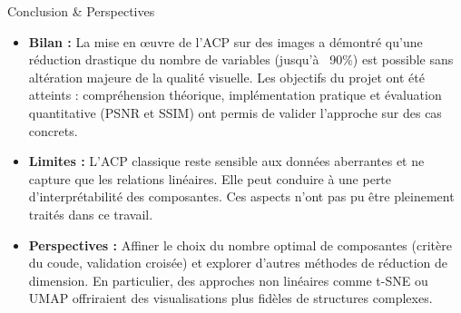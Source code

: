 \documentclass{beamer}
\begin{document}
\begin{frame}{Conclusion \& Perspectives}
\begin{itemize}
  \item \textbf{Bilan :} La mise en œuvre de l’ACP sur des images a démontré qu’une réduction drastique du nombre de variables (jusqu’à ~90\%) est possible sans altération majeure de la qualité visuelle. Les objectifs du projet ont été atteints : compréhension théorique, implémentation pratique et évaluation quantitative (PSNR et SSIM) ont permis de valider l’approche sur des cas concrets.
  \item \textbf{Limites :} L’ACP classique reste sensible aux données aberrantes et ne capture que les relations linéaires. Elle peut conduire à une perte d’interprétabilité des composantes. Ces aspects n’ont pas pu être pleinement traités dans ce travail.
  \item \textbf{Perspectives :} Affiner le choix du nombre optimal de composantes (critère du coude, validation croisée) et explorer d’autres méthodes de réduction de dimension. En particulier, des approches non linéaires comme t-SNE ou UMAP offriraient des visualisations plus fidèles de structures complexes.
\end{itemize}
\end{frame}
\end{document}
